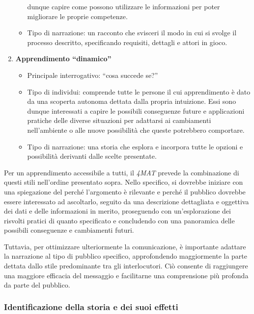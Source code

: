 \begin{enumerate}
\begin{itemize}
        dunque capire come possono utilizzare le informazioni per poter migliorare le proprie competenze.
        \item Tipo di narrazione: un racconto che svisceri il modo in cui si svolge il processo descritto, specificando requisiti, dettagli e attori in gioco.
    \end{itemize}
    \item \textbf{Apprendimento ``dinamico''}
    \begin{itemize}
        \item Principale interrogativo: ``cosa succede se?''
        \item Tipo di individui: comprende tutte le persone il cui apprendimento è dato da una scoperta autonoma dettata dalla propria intuizione.
        Essi sono dunque interessati a capire le possibili conseguenze future e applicazioni pratiche delle diverse situazioni per adattarsi ai cambiamenti nell'ambiente o alle nuove possibilità che queste potrebbero comportare.
        \item Tipo di narrazione: una storia che esplora e incorpora tutte le opzioni e possibilità derivanti dalle scelte presentate.
    \end{itemize}
\end{enumerate}
Per un apprendimento accessibile a tutti, il \emph{4MAT} prevede la combinazione di questi stili nell'ordine presentato sopra. Nello specifico, si dovrebbe iniziare con una spiegazione del perché l'argomento è rilevante e perché il pubblico dovrebbe
essere interessato ad ascoltarlo, seguito da una descrizione dettagliata e oggettiva dei dati e delle informazioni in merito, proseguendo con un'esplorazione dei risvolti pratici di quanto specificato e concludendo con una panoramica delle possibili 
conseguenze e cambiamenti futuri. 

Tuttavia, per ottimizzare ulteriormente la comunicazione, è importante adattare la narrazione al tipo di pubblico specifico, approfondendo maggiormente la parte dettata dallo stile predominante tra gli interlocutori.
Ciò consente di raggiungere una maggiore efficacia del messaggio e facilitarne una comprensione più profonda da parte del pubblico.

\subsubsection{Identificazione della storia e dei suoi effetti}

